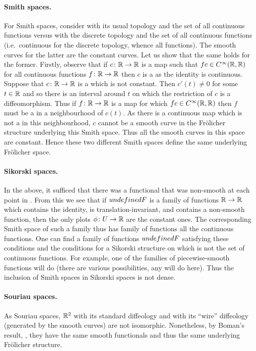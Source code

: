 \documentclass[%
a4paper,%
arxiv,%
defaults
]{myclass}
\begin{document}
\paragraph{Smith spaces.}
For Smith spaces, consider \R with its usual topology and the set of all continuous functions versus \R with the discrete topology and the set of all continuous functions (i.e.\ continuous for the discrete topology, whence all functions).
The smooth curves for the latter are the constant curves.
Let us show that the same holds for the former.
Firstly, observe that if \(c \colon \mathbb{R} \to \mathbb{R}\) is a map such that \(f c \in C^\infty(\mathbb{R},\mathbb{R})\) for all continuous functions \(f \colon \mathbb{R} \to \mathbb{R}\) then \(c\) is a \cimap as the identity is continuous.
Suppose that \(c \colon \mathbb{R} \to \mathbb{R}\) is a \cimap which is not constant.
Then \(c'(t) \ne 0\) for some \(t \in \mathbb{R}\) and so there is an interval around \(t\) on which the restriction of \(c\) is a diffeomorphism.
Thus if \(f \colon \mathbb{R} \to \mathbb{R}\) is a map for which \(f c \in C^\infty(\mathbb{R},\mathbb{R})\) then \(f\) must be a \cimap in a neighbourhood of \(c(t)\).
As there is a continuous map which is not a \cimap in this neighbourhood, \(c\) cannot be a smooth curve in the Fr\"olicher structure underlying this Smith space.
Thus all the smooth curves in this space are constant.
Hence these two different Smith spaces define the same underlying Fr\"olicher space.

\paragraph{Sikorski spaces.}
In the above, it sufficed that there was a functional that was non\hyp{}smooth at each point in \R.
From this we see that if \(\m{F}\) is a family of functions \(\mathbb{R} \to \mathbb{R}\) which contains the identity, is translation\hyp{}invariant, and contains a non\hyp{}smooth function, then the only plots \(\phi \colon U \to \mathbb{R}\) are the constant ones.
The corresponding Smith space of such a family thus has family of functions all the continuous functions.
One can find a family of functions \(\m{F}\) satisfying these conditions and the conditions for a Sikorski structure on \R which is not the set of continuous functions.
For example, one of the families of piecewise\hyp{}smooth functions will do (there are various possibilities, any will do here).
Thus the inclusion of Smith spaces in Sikorski spaces is not dense.

\paragraph{Souriau spaces.}
As Souriau spaces, \(\mathbb{R}^2\) with its standard diffeology and with its ``wire'' diffeology (generated by the smooth curves) are not isomorphic.
Nonetheless, by Boman's result, \cite{jb3}, they have the same smooth functionals and thus the same underlying Fr\"olicher structure.
\end{document}
